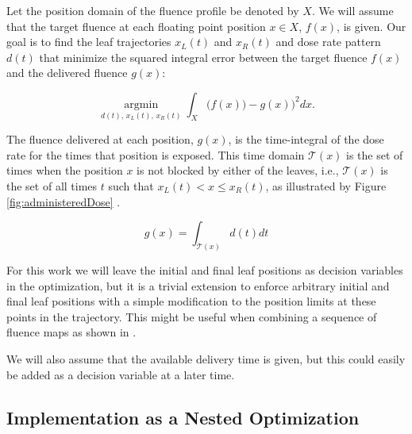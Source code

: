 Let the position domain of the fluence profile be denoted by $X$.
We will assume that the target fluence at each floating point position $x\in X$, $f(x)$, is given.
Our goal is to find the leaf trajectories $x_L(t)$ and $x_R(t)$ and dose rate pattern $d(t)$
that minimize the squared integral error between the target fluence $f(x)$ and the delivered fluence $g(x)$:

\begin{equation}
\underset{d(t), \, x_L(t), \, x_R(t)}{\operatorname{argmin}}
\int_X \bigg(f(x)) - g(x)\bigg)^2 dx .
\label{eqn:fluenceMapOptimization}
\end{equation}

\vspace{6pt}


The fluence delivered at each position, $g(x)$, is the time-integral of the dose rate for the times that position is exposed.
This time domain $\mathcal{T}(x)$ is the set of times when the position $x$ is not blocked by either of the leaves, i.e.,
$\mathcal{T}(x)$ is the set of all times $t$ such that $x_L(t) < x \leq x_R(t)$,
as illustrated by Figure \ref{fig:administeredDose} .

\begin{equation}
g(x) = \int_{\mathcal{T}(x)} d(t) dt
\label{eqn:deliveredFluenceDose}
\end{equation}



For this work we will leave the initial and final leaf positions as decision variables in the optimization,
but it is a trivial extension to enforce arbitrary initial and final leaf positions
with a simple modification to the position limits at these points in the trajectory.
This might be useful when combining a sequence of fluence maps as shown in \cite{balvertcraft}.

We will also assume that the available delivery time is given,
but this could easily be added as a decision variable at a later time.



\subsection{Implementation as a Nested Optimization}

